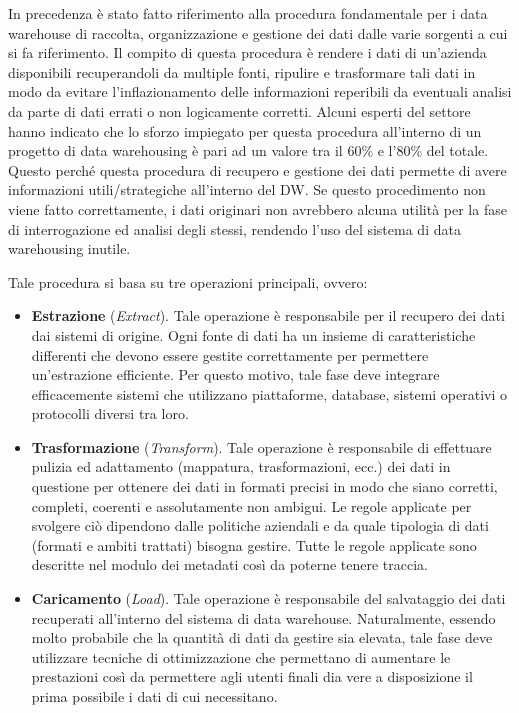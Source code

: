 In precedenza è stato fatto riferimento alla procedura fondamentale per i data warehouse di raccolta, organizzazione e gestione dei dati dalle varie sorgenti a cui si fa riferimento. Il compito di questa procedura è rendere i dati di un'azienda disponibili recuperandoli da multiple fonti, ripulire e trasformare tali dati in modo da evitare l'inflazionamento delle informazioni reperibili da eventuali analisi da parte di dati errati o non logicamente corretti. Alcuni esperti del settore hanno indicato che lo sforzo impiegato per questa procedura all'interno di un progetto di data warehousing è pari ad un valore tra il 60\% e l'80\% del totale. Questo perché questa procedura di recupero e gestione dei dati permette di avere informazioni utili/strategiche all'interno del DW. Se questo procedimento non viene fatto correttamente, i dati originari non avrebbero alcuna utilità per la fase di interrogazione ed analisi degli stessi, rendendo l'uso del sistema di data warehousing inutile.\cite{researchgate_etl_process}

Tale procedura si basa su tre operazioni principali, ovvero:\cite{sciencedirect_data_warehouse_model}
\begin{itemize}
    \item \textbf{Estrazione} (\textit{Extract}). Tale operazione è responsabile per il recupero dei dati dai sistemi di origine. Ogni fonte di dati ha un insieme di caratteristiche differenti che devono essere gestite correttamente per permettere un'estrazione efficiente. Per questo motivo, tale fase deve integrare efficacemente sistemi che utilizzano piattaforme, database, sistemi operativi o protocolli diversi tra loro.
    \item \textbf{Trasformazione} (\textit{Transform}). Tale operazione è responsabile di effettuare pulizia ed adattamento (mappatura, trasformazioni, ecc.) dei dati in questione per ottenere dei dati in formati precisi in modo che siano corretti, completi, coerenti e assolutamente non ambigui. Le regole applicate per svolgere ciò dipendono dalle politiche aziendali e da quale tipologia di dati (formati e ambiti trattati) bisogna gestire. Tutte le regole applicate sono descritte nel modulo dei metadati così da poterne tenere traccia.
    \item \textbf{Caricamento} (\textit{Load}). Tale operazione è responsabile del salvataggio dei dati recuperati all'interno del sistema di data warehouse. Naturalmente, essendo molto probabile che la quantità di dati da gestire sia elevata, tale fase deve utilizzare tecniche di ottimizzazione che permettano di aumentare le prestazioni così da permettere agli utenti finali dia vere a disposizione il prima possibile i dati di cui necessitano.
\end{itemize}


